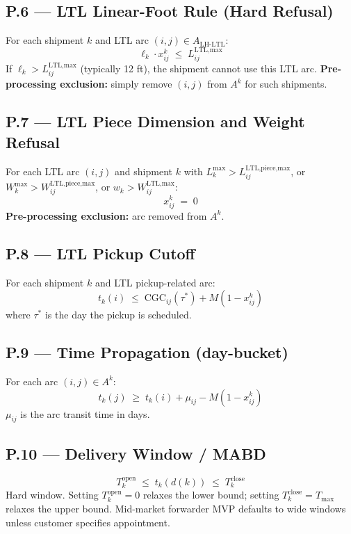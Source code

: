 \documentclass[11pt,a4paper]{article}
\theoremstyle{definition}
\begin{document}
\subsection*{P.6 — LTL Linear-Foot Rule (Hard Refusal)}
For each shipment $k$ and LTL arc $(i,j) \in A_{\text{LH-LTL}}$:
\begin{equation}
  \ell_k \cdot x_{ij}^k \;\leq\; L_{ij}^{\text{LTL,max}}
  \label{eq:tk-P6}
\end{equation}
If $\ell_k > L_{ij}^{\text{LTL,max}}$ (typically 12 ft), the shipment cannot use this LTL arc.
\textbf{Pre-processing exclusion:} simply remove $(i,j)$ from $A^k$ for such shipments.

\subsection*{P.7 — LTL Piece Dimension and Weight Refusal}
For each LTL arc $(i,j)$ and shipment $k$ with $L_k^{\max} > L_{ij}^{\text{LTL,piece,max}}$,
or $W_k^{\max} > W_{ij}^{\text{LTL,piece,max}}$, or $w_k > W_{ij}^{\text{LTL,max}}$:
\begin{equation}
  x_{ij}^k \;=\; 0
  \label{eq:tk-P7}
\end{equation}
\textbf{Pre-processing exclusion:} arc removed from $A^k$.

\subsection*{P.8 — LTL Pickup Cutoff}
For each shipment $k$ and LTL pickup-related arc:
\begin{equation}
  t_k(i) \;\leq\; \text{CGC}_{ij}(\tau^*) + M (1 - x_{ij}^k)
  \label{eq:tk-P8}
\end{equation}
where $\tau^*$ is the day the pickup is scheduled.

\subsection*{P.9 — Time Propagation (day-bucket)}
For each arc $(i,j) \in A^k$:
\begin{equation}
  t_k(j) \;\geq\; t_k(i) + \mu_{ij} - M (1 - x_{ij}^k)
  \label{eq:tk-P9}
\end{equation}
$\mu_{ij}$ is the arc transit time in days.

\subsection*{P.10 — Delivery Window / MABD}
\begin{equation}
  T_k^{\text{open}} \;\leq\; t_k(d(k)) \;\leq\; T_k^{\text{close}}
  \label{eq:tk-P10}
\end{equation}
Hard window. Setting $T_k^{\text{open}} = 0$ relaxes the lower bound; setting
$T_k^{\text{close}} = T_{\max}$ relaxes the upper bound. Mid-market forwarder MVP defaults
to wide windows unless customer specifies appointment.
\end{document}
